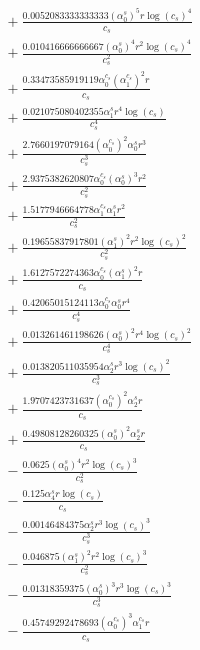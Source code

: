 \documentclass[10pt]{article}
\begin{document}
\begin{align*}
&{}  + \frac{0.0052083333333333 \left(\alpha_{0}^s\right)^{5} r \log{\left(c_{s} \right)}^{4}}{c_{s}} \\
&{}  + \frac{0.010416666666667 \left(\alpha_{0}^s\right)^{4} r^{2} \log{\left(c_{s} \right)}^{4}}{c_{s}^{2}} \\
&{}  + \frac{0.33473585919119 \alpha_{0}^{c_s} \left(\alpha_{1}^{c_s}\right)^{2} r}{c_{s}} \\
&{}  + \frac{0.021075080402355 \alpha_{1}^s r^{4} \log{\left(c_{s} \right)}}{c_{s}^{4}} \\
&{}  + \frac{2.7660197079164 \left(\alpha_{0}^{c_s}\right)^{2} \alpha_{0}^s r^{3}}{c_{s}^{3}} \\
&{}  + \frac{2.9375382620807 \alpha_{0}^{c_s} \left(\alpha_{0}^s\right)^{3} r^{2}}{c_{s}^{2}} \\
&{}  + \frac{1.5177946664778 \alpha_{1}^{c_s} \alpha_{1}^s r^{2}}{c_{s}^{2}} \\
&{}  + \frac{0.19655837917801 \left(\alpha_{1}^s\right)^{2} r^{2} \log{\left(c_{s} \right)}^{2}}{c_{s}^{2}} \\
&{}  + \frac{1.6127572274363 \alpha_{0}^{c_s} \left(\alpha_{1}^s\right)^{2} r}{c_{s}} \\
&{}  + \frac{0.42065015124113 \alpha_{0}^{c_s} \alpha_{0}^s r^{4}}{c_{s}^{4}} \\
&{}  + \frac{0.013261461198626 \left(\alpha_{0}^s\right)^{2} r^{4} \log{\left(c_{s} \right)}^{2}}{c_{s}^{4}} \\
&{}  + \frac{0.013820511035954 \alpha_{2}^s r^{3} \log{\left(c_{s} \right)}^{2}}{c_{s}^{3}} \\
&{}  + \frac{1.9707423731637 \left(\alpha_{0}^{c_s}\right)^{2} \alpha_{2}^s r}{c_{s}} \\
&{}  + \frac{0.49808128260325 \left(\alpha_{0}^s\right)^{2} \alpha_{2}^s r}{c_{s}} \\
&{}  - \frac{0.0625 \left(\alpha_{0}^s\right)^{4} r^{2} \log{\left(c_{s} \right)}^{3}}{c_{s}^{2}} \\
&{}  - \frac{0.125 \alpha_{4}^s r \log{\left(c_{s} \right)}}{c_{s}} \\
&{}  - \frac{0.00146484375 \alpha_{2}^s r^{3} \log{\left(c_{s} \right)}^{3}}{c_{s}^{3}} \\
&{}  - \frac{0.046875 \left(\alpha_{1}^s\right)^{2} r^{2} \log{\left(c_{s} \right)}^{3}}{c_{s}^{2}} \\
&{}  - \frac{0.01318359375 \left(\alpha_{0}^s\right)^{3} r^{3} \log{\left(c_{s} \right)}^{3}}{c_{s}^{3}} \\
&{}  - \frac{0.45749292478693 \left(\alpha_{0}^{c_s}\right)^{3} \alpha_{1}^{c_s} r}{c_{s}} \\

\end{align*}
\end{document}
